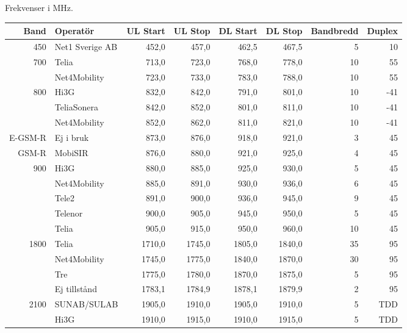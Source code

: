 Frekvenser i MHz.

\begin{longtable}{rlrrrrrr}
	    \bf Band & \bf Operatör    & \bf UL Start & \bf UL Stop & \bf DL Start & \bf DL Stop & \bf Bandbredd & \bf Duplex \\ \hline
	\endhead
450     & Net1 Sverige AB        & 452,0  & 457,0  & 462,5  & 467,5  & 5   & 10  \\ \hline
700     & Telia                  & 713,0  & 723,0  & 768,0  & 778,0  & 10  & 55  \\ 
        & Net4Mobility           & 723,0  & 733,0  & 783,0  & 788,0  & 10  & 55  \\ \hline
  800   & Hi3G                   & 832,0  & 842,0  & 791,0  & 801,0  & 10  & -41 \\
        & TeliaSonera            & 842,0  & 852,0  & 801,0  & 811,0  & 10  & -41 \\
        & Net4Mobility           & 852,0  & 862,0  & 811,0  & 821,0  & 10  & -41 \\ \hline
E-GSM-R & Ej i bruk              & 873,0  & 876,0  & 918,0  & 921,0  & 3   & 45  \\
GSM-R   & MobiSIR                & 876,0  & 880,0  & 921,0  & 925,0  & 4   & 45  \\ \hline
900     & Hi3G                   & 880,0  & 885,0  & 925,0  & 930,0  & 5   & 45  \\
        & Net4Mobility           & 885,0  & 891,0  & 930,0  & 936,0  & 6   & 45  \\
        & Tele2                  & 891,0  & 900,0  & 936,0  & 945,0  & 9   & 45  \\
        & Telenor                & 900,0  & 905,0  & 945,0  & 950,0  & 5   & 45  \\
        & Telia                  & 905,0  & 915,0  & 950,0  & 960,0  & 10  & 45  \\ \hline
1800    & Telia                  & 1710,0 & 1745,0 & 1805,0 & 1840,0 & 35  & 95  \\
        & Net4Mobility           & 1745,0 & 1775,0 & 1840,0 & 1870,0 & 30  & 95  \\
        & Tre                    & 1775,0 & 1780,0 & 1870,0 & 1875,0 & 5   & 95  \\
        & Ej tillstånd          & 1783,1 & 1784,9 & 1878,1 & 1879,9 & 2   & 95  \\ \hline
2100    & SUNAB/SULAB            & 1905,0 & 1910,0 & 1905,0 & 1910,0 & 5   & TDD \\
        & Hi3G                   & 1910,0 & 1915,0 & 1910,0 & 1915,0 & 5   & TDD \\

\end{longtable}
